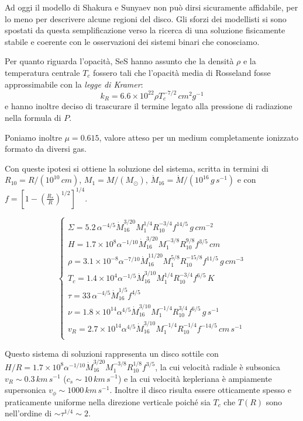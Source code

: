 \documentclass[a4paperbi]{article}
\begin{document}
Ad oggi il modello di Shakura e Sunyaev non può dirsi sicuramente affidabile, per lo meno per descrivere alcune regioni del disco. Gli sforzi dei modellisti si sono spostati da questa semplificazione verso la ricerca di una soluzione fisicamente stabile e coerente con le osservazioni dei sistemi binari che conosciamo.

Per quanto riguarda l'opacità, SeS hanno assunto che la densità $\rho$ e la temperatura centrale $T_c$ fossero tali che l'opacità media di Rosseland fosse approssimabile con la \textit{legge di Kramer}:
\begin{equation}
	k_R=6.6\times10^{22}\rho T_c^{-7/2}\,cm^2g^{-1}
\end{equation}
e hanno inoltre deciso di trascurare il termine legato alla pressione di radiazione nella formula di $P$.

Poniamo inoltre $\mu=0.615$, valore atteso per un medium completamente ionizzato formato da diversi gas. 

Con queste ipotesi si ottiene la soluzione del sistema, scritta in termini di $R_{10}=R/(10^{10}\,cm)$, $M_{1}=M/(M_\odot)$, $\dot{M}_{16}=\dot{M}/(10^{16}\,g\,s^{-1})$ e con $f=\left[1-\left(\frac{R_*}{R}\right)^{1/2}\right]^{1/4}$. 

\begin{spacing}{1.3}
\begin{equation}
	\begin{cases}
		\Sigma=5.2\,\alpha^{-4/5}\dot{M}_{16}^{3/20}M^{1/4}_1R_{10}^{-3/4}f^{14/5}\,g\,cm^{-2}\\
		H=1.7\times10^8\alpha^{-1/10}\dot{M}^{3/20}_{16}M^{-3/8}_1R_{10}^{9/8}f^{3/5}\,cm\\
		\rho=3.1\times10^{-8}\alpha^{-7/10}\dot{M}^{11/20}_{16}M^{5/8}_1R_{10}^{-15/8}f^{11/5}\,g\,cm^{-3}\\
		T_c=1.4\times10^{4}\alpha^{-1/5}\dot{M}^{3/10}_{16}M^{1/4}_1R_{10}^{-3/4}f^{6/5}\,K\\
		\tau=33\,\alpha^{-4/5}\dot{M}^{1/5}_{16}f^{4/5}\\
		\nu=1.8\times10^{14}\alpha^{4/5}\dot{M}^{3/10}_{16}M^{-1/4}_1R_{10}^{3/4}f^{6/5}\,g\,s^{-1}\\
		v_R=2.7\times10^{14}\alpha^{4/5}\dot{M}^{3/10}_{16}M^{-1/4}_1R_{10}^{-1/4}f^{-14/5}\,cm\,s^{-1}\\
	\end{cases}
\end{equation}
\end{spacing}

	Questo sistema di soluzioni rappresenta un disco sottile con \\$H/R=1.7\times10^8\alpha^{-1/10}\dot{M}^{3/20}_{16}M^{-3/8}_1R_{10}^{1/8}f^{3/5}$, la cui velocità radiale è subsonica $v_R\sim 0.3\,km\,s^{-1}$ ($c_s\sim10\,km\,s^{-1}$) e la cui velocità kepleriana è ampiamente supersonica $v_\phi\sim1000\,km\,s^{-1}$. Inoltre il disco risulta essere otticamente spesso e praticamente uniforme nella direzione verticale poiché sia $T_c$ che $T(R)$ sono nell'ordine di $\sim\tau^{1/4}\sim2$.
\end{document}
